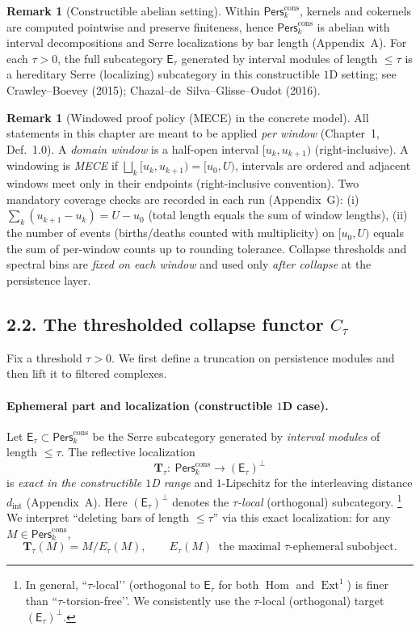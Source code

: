 \documentclass[11pt]{article}
\DeclareMathOperator{\Ext}{Ext}
\DeclareMathOperator{\Hom}{Hom}
\newcommand{\Pers}{\mathsf{Pers}}
\numberwithin{equation}{section}
\theoremstyle{definition}
\newtheorem{remark}[theorem]{Remark}
\begin{document}
\begin{remark}[Constructible abelian setting]\label{rem:constructible-abelian}
Within \(\Pers^{\mathrm{cons}}_k\), kernels and cokernels are computed pointwise and preserve finiteness, hence \(\Pers^{\mathrm{cons}}_k\) is abelian with interval decompositions and Serre localizations by bar length (Appendix~A). For each \(\tau>0\), the full subcategory \(\mathsf{E}_\tau\) generated by interval modules of length \(\le \tau\) is a hereditary Serre (localizing) subcategory in this constructible \(1\)D setting; see Crawley--Boevey (2015); Chazal--de~Silva--Glisse--Oudot (2016).
\end{remark}

\begin{remark}[Windowed proof policy (MECE) in the concrete model]\label{rem:ch2-mece}
All statements in this chapter are meant to be applied \emph{per window} (Chapter~1, Def.~1.0).
A \emph{domain window} is a half-open interval \([u_k,u_{k+1})\) (right-inclusive).
A windowing is \emph{MECE} if \(\bigsqcup_k [u_k,u_{k+1})=[u_0,U)\), intervals are ordered and adjacent windows meet only in their endpoints (right-inclusive convention).
Two mandatory coverage checks are recorded in each run (Appendix~G): (i) \(\sum_k (u_{k+1}-u_k)=U-u_0\) (total length equals the sum of window lengths), (ii) the number of events (births/deaths counted with multiplicity) on \([u_0,U)\) equals the sum of per-window counts up to rounding tolerance.
Collapse thresholds and spectral bins are \emph{fixed on each window} and used only \emph{after collapse} at the persistence layer.
\end{remark}

\subsection*{2.2. The thresholded collapse functor \texorpdfstring{$C_\tau$}{C\_\texttau}}
Fix a threshold \(\tau>0\). We first define a truncation on persistence modules and then lift it to filtered complexes.

\paragraph{Ephemeral part and localization (constructible $1$D case).}
Let \(\mathsf{E}_\tau\subset \Pers^{\mathrm{cons}}_k\) be the Serre subcategory generated by \emph{interval modules} of length \(\le \tau\).
The reflective localization
\[
\mathbf{T}_\tau:\ \Pers^{\mathrm{cons}}_k\longrightarrow (\mathsf{E}_\tau)^{\perp}
\]
is \emph{exact in the constructible $1$D range} and \(1\)-Lipschitz for the interleaving distance \(d_{\mathrm{int}}\) (Appendix~A). Here \((\mathsf{E}_\tau)^{\perp}\) denotes the \emph{$\tau$-local} (orthogonal) subcategory.%
\footnote{In general, “$\tau$-local’’ (orthogonal to \(\mathsf{E}_\tau\) for both \(\Hom\) and \(\Ext^1\)) is finer than “$\tau$-torsion-free’’. We consistently use the $\tau$-local (orthogonal) target \((\mathsf{E}_\tau)^{\perp}\).}
We interpret “deleting bars of length \(\le\tau\)” via this exact localization: for any \(M\in\Pers^{\mathrm{cons}}_k\),
\[
\mathbf{T}_\tau(M)=M/E_\tau(M),\qquad E_\tau(M)\ \text{ the maximal \(\tau\)-ephemeral subobject.}
\]
\end{document}
